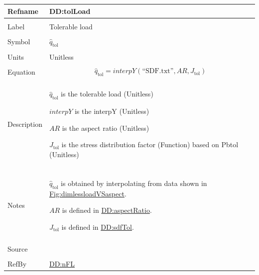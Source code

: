 \documentclass[12pt]{article}
\begin{document}
\vspace{\baselineskip}
\noindent
\begin{minipage}{\textwidth}
\begin{tabular}{>{\raggedright}p{}>{\raggedright\arraybackslash}p{}}
\toprule \textbf{Refname} & \textbf{DD:tolLoad}
\label{DD:tolLoad}
\\ \midrule \\
Label & Tolerable load
        
\\ \midrule \\
Symbol & ${\hat{q}_{\text{tol}}}$
         
\\ \midrule \\
Units & Unitless
        
\\ \midrule \\
Equation & \begin{displaymath}
           {\hat{q}_{\text{tol}}}=\mathit{interpY}\left(\text{``SDF.txt''},\mathit{AR},{J_{\text{tol}}}\right)
           \end{displaymath}
\\ \midrule \\
Description & \begin{symbDescription}
              \item{${\hat{q}_{\text{tol}}}$ is the tolerable load (Unitless)}
              \item{$\mathit{interpY}$ is the interpY (Unitless)}
              \item{$\mathit{AR}$ is the aspect ratio (Unitless)}
              \item{${J_{\text{tol}}}$ is the stress distribution factor (Function) based on Pbtol (Unitless)}
              \end{symbDescription}
\\ \midrule \\
Notes & ${\hat{q}_{\text{tol}}}$ is obtained by interpolating from data shown in \hyperref[Figure:dimlessloadVSaspect]{Fig:dimlessloadVSaspect}.
        
        $\mathit{AR}$ is defined in \hyperref[DD:aspectRatio]{DD:aspectRatio}.
        
        ${J_{\text{tol}}}$ is defined in \hyperref[DD:sdfTol]{DD:sdfTol}.
        
\\ \midrule \\
Source & \cite{astm2009}
         
\\ \midrule \\
RefBy & \hyperref[DD:nFL]{DD:nFL}
        
\\ \bottomrule
\end{tabular}
\end{minipage}
\end{document}
